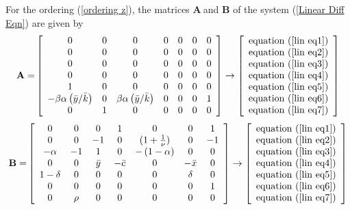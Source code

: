 \documentclass[12pt]{article}
\begin{document}
For the ordering (\ref{ordering z}), the matrices $\mathbf{A}\mathbb{\ }$and 
$\mathbf{B}$ of the system (\ref{Linear Diff Eqn}) are given by%
\begin{equation*}
\mathbf{A=}\left[ 
\begin{array}{ccccccc}
0 & 0 & 0 & 0 & 0 & 0 & 0 \\ 
0 & 0 & 0 & 0 & 0 & 0 & 0 \\ 
0 & 0 & 0 & 0 & 0 & 0 & 0 \\ 
0 & 0 & 0 & 0 & 0 & 0 & 0 \\ 
1 & 0 & 0 & 0 & 0 & 0 & 0 \\ 
-\beta \alpha \left( \bar{y}/\bar{k}\right) & 0 & \beta \alpha \left( \bar{y}%
/\bar{k}\right) & 0 & 0 & 0 & 1 \\ 
0 & 1 & 0 & 0 & 0 & 0 & 0%
\end{array}%
\right] \rightarrow \left[ 
\begin{array}{c}
\text{equation (\ref{lin eq1})} \\ 
\text{equation (\ref{lin eq2})} \\ 
\text{equation (\ref{lin eq3})} \\ 
\text{equation (\ref{lin eq4})} \\ 
\text{equation (\ref{lin eq5})} \\ 
\text{equation (\ref{lin eq6})} \\ 
\text{equation (\ref{lin eq7})}%
\end{array}%
\right]
\end{equation*}%
\begin{equation*}
\mathbf{B=}\left[ 
\begin{array}{ccccccc}
0 & 0 & 0 & 1 & 0 & 0 & 1 \\ 
0 & 0 & -1 & 0 & (1+\frac{1}{\nu }) & 0 & -1 \\ 
-\alpha & -1 & 1 & 0 & -\left( 1-\alpha \right) & 0 & 0 \\ 
0 & 0 & \bar{y} & -\bar{c} & 0 & -\bar{x} & 0 \\ 
1-\delta & 0 & 0 & 0 & 0 & \delta & 0 \\ 
0 & 0 & 0 & 0 & 0 & 0 & 1 \\ 
0 & \rho & 0 & 0 & 0 & 0 & 0%
\end{array}%
\right] \rightarrow \left[ 
\begin{array}{c}
\text{equation (\ref{lin eq1})} \\ 
\text{equation (\ref{lin eq2})} \\ 
\text{equation (\ref{lin eq3})} \\ 
\text{equation (\ref{lin eq4})} \\ 
\text{equation (\ref{lin eq5})} \\ 
\text{equation (\ref{lin eq6})} \\ 
\text{equation (\ref{lin eq7})}%
\end{array}%
\right]
\end{equation*}
\end{document}
